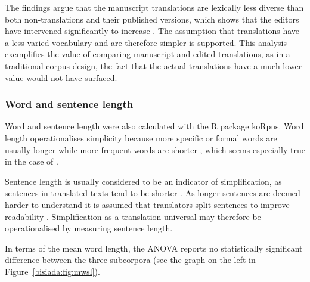 \documentclass[output=paper]{LSP/langsci}
\begin{document}
\noindent The findings argue that the manuscript translations are lexically less diverse than both non-translations and their published versions, which shows that the editors have intervened significantly to increase . The assumption that translations have a less varied vocabulary and are therefore simpler is supported. This analysis exemplifies the value of comparing manuscript and edited translations, as in a traditional corpus design, the fact that the actual translations have a much lower  value would not have surfaced.

\subsubsection{Word and sentence length}

Word and sentence length were also calculated with the R package koRpus. Word length operationalises simplicity because more specific or formal words are usually longer while more frequent words are shorter \parencites[366]{kruger12}{biber91}, which seems especially true in the case of  \parencite[46]{benetal04}.

Sentence length is usually considered to be an indicator of simplification, as sentences in translated texts tend to be shorter \parencite{laviosa02}. As longer sentences are deemed harder to understand \parencite[though this may be problematic generalisation; see the discussion in][165--169]{Bisiada2013} it is assumed that translators split sentences to improve readability \parencites[212]{vinhan05}[21]{bisiada14}. Simplification as a translation universal may therefore be operationalised by measuring sentence length.

In terms of the mean word length, the ANOVA reports no statistically significant difference between the three subcorpora (see the graph on the left in Figure~\ref{bisiada:fig:mwsl}).
\end{document}
